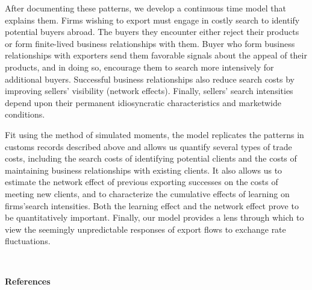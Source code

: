\documentclass[12pt]{article}
\begin{document}
After documenting these patterns, we develop a continuous time model that
explains them. Firms wishing to export must engage in costly search to
identify potential buyers abroad. The buyers they encounter either reject
their products or form finite-lived business relationships with them. Buyer
who form business relationships with exporters send them favorable signals
about the appeal of their products, and in doing so, encourage them to
search more intensively for additional buyers. Successful business
relationships also reduce search costs by improving sellers' visibility
(network effects). Finally, sellers' search intensities depend upon their
permanent idiosyncratic characteristics and marketwide conditions.

Fit using the method of simulated moments, the model replicates the patterns
in customs records described above and allows us quantify several types of
trade costs, including the search costs of identifying potential clients and
the costs of maintaining business relationships with existing clients. It
also allows us to estimate the network effect of previous exporting
successes on the costs of meeting new clients, and to characterize the
cumulative effects of learning on firms'search intensities. Both the
learning effect and the network effect prove to be quantitatively important.
Finally, our model provides a lens through which to view the seemingly
unpredictable responses of export flows to exchange rate fluctuations.

\begin{center}
\ \pagebreak

{\Large \textbf{References}}
\end{center}
\end{document}
